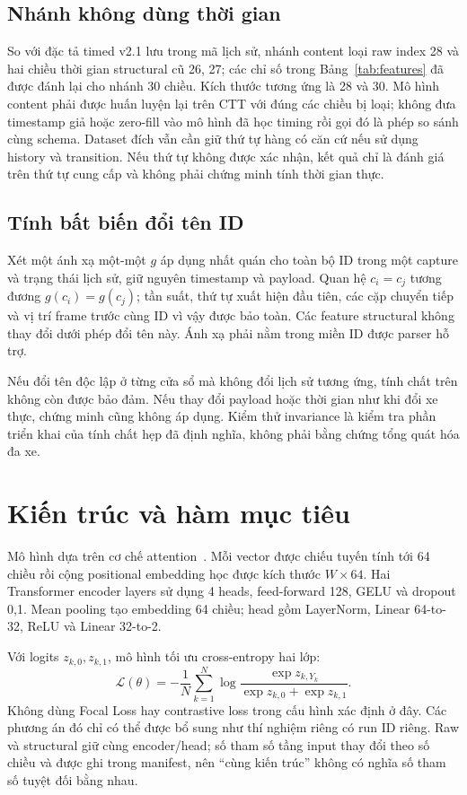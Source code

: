 \documentclass[12pt,a4paper,oneside,openany]{extbook}
\begin{document}
\subsection{Nhánh không dùng thời gian}
So với đặc tả timed v2.1 lưu trong mã lịch sử, nhánh content loại raw index 28 và hai chiều thời gian structural cũ 26, 27; các chỉ số trong Bảng~\ref{tab:features} đã được đánh lại cho nhánh 30 chiều. Kích thước tương ứng là 28 và 30. Mô hình content phải được huấn luyện lại trên CTT với đúng các chiều bị loại; không đưa timestamp giả hoặc zero-fill vào mô hình đã học timing rồi gọi đó là phép so sánh cùng schema. Dataset đích vẫn cần giữ thứ tự hàng có căn cứ nếu sử dụng history và transition. Nếu thứ tự không được xác nhận, kết quả chỉ là đánh giá trên thứ tự cung cấp và không phải chứng minh tính thời gian thực.

\subsection{Tính bất biến đổi tên ID}
Xét một ánh xạ một-một $g$ áp dụng nhất quán cho toàn bộ ID trong một capture và trạng thái lịch sử, giữ nguyên timestamp và payload. Quan hệ $c_i=c_j$ tương đương $g(c_i)=g(c_j)$; tần suất, thứ tự xuất hiện đầu tiên, các cặp chuyển tiếp và vị trí frame trước cùng ID vì vậy được bảo toàn. Các feature structural không thay đổi dưới phép đổi tên này. Ánh xạ phải nằm trong miền ID được parser hỗ trợ.

Nếu đổi tên độc lập ở từng cửa sổ mà không đổi lịch sử tương ứng, tính chất trên không còn được bảo đảm. Nếu thay đổi payload hoặc thời gian như khi đổi xe thực, chứng minh cũng không áp dụng. Kiểm thử invariance là kiểm tra phần triển khai của tính chất hẹp đã định nghĩa, không phải bằng chứng tổng quát hóa đa xe.

\section{Kiến trúc và hàm mục tiêu}
Mô hình dựa trên cơ chế attention~\cite{vaswani2017attention}. Mỗi vector được chiếu tuyến tính tới 64 chiều rồi cộng positional embedding học được kích thước $W\times64$. Hai Transformer encoder layers sử dụng 4 heads, feed-forward 128, GELU và dropout 0,1. Mean pooling tạo embedding 64 chiều; head gồm LayerNorm, Linear 64-to-32, ReLU và Linear 32-to-2.

Với logits $z_{k,0},z_{k,1}$, mô hình tối ưu cross-entropy hai lớp:
\begin{equation}
\mathcal L(\theta)=-\frac1N\sum_{k=1}^N\log\frac{\exp z_{k,Y_k}}{\exp z_{k,0}+\exp z_{k,1}}.
\end{equation}
Không dùng Focal Loss hay contrastive loss trong cấu hình xác định ở đây. Các phương án đó chỉ có thể được bổ sung như thí nghiệm riêng có run ID riêng. Raw và structural giữ cùng encoder/head; số tham số tầng input thay đổi theo số chiều và được ghi trong manifest, nên ``cùng kiến trúc'' không có nghĩa số tham số tuyệt đối bằng nhau.
\end{document}
